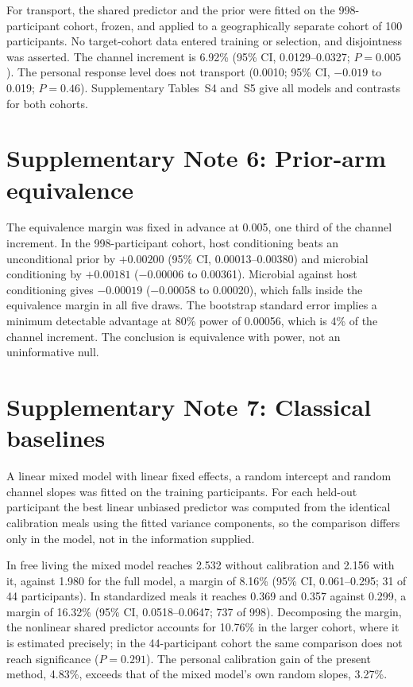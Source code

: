 \documentclass[10pt]{article}
\begin{document}
For transport, the shared predictor and the prior were fitted on the 998-participant cohort,
frozen, and applied to a geographically separate cohort of 100 participants. No target-cohort data
entered training or selection, and disjointness was asserted. The channel increment is 6.92\%
(95\% CI, 0.0129--0.0327; $P=0.005$). The personal response level does not transport
(0.0010; 95\% CI, $-0.019$ to 0.019; $P=0.46$). Supplementary Tables~S4 and~S5 give all models and
contrasts for both cohorts.



\clearpage

\section*{Supplementary Note 6: Prior-arm equivalence}

The equivalence margin was fixed in advance at 0.005, one third of the channel increment. In the
998-participant cohort, host conditioning beats an unconditional prior by $+0.00200$
(95\% CI, 0.00013--0.00380) and microbial conditioning by $+0.00181$ ($-0.00006$ to 0.00361).
Microbial against host conditioning gives $-0.00019$ ($-0.00058$ to 0.00020), which falls inside
the equivalence margin in all five draws. The bootstrap standard error implies a minimum
detectable advantage at 80\% power of 0.00056, which is 4\% of the channel increment. The
conclusion is equivalence with power, not an uninformative null.


\clearpage

\section*{Supplementary Note 7: Classical baselines}

A linear mixed model with linear fixed effects, a random intercept and random channel slopes was
fitted on the training participants. For each held-out participant the best linear unbiased
predictor was computed from the identical calibration meals using the fitted variance components,
so the comparison differs only in the model, not in the information supplied.

In free living the mixed model reaches 2.532 without calibration and 2.156 with it, against 1.980
for the full model, a margin of 8.16\% (95\% CI, 0.061--0.295; 31 of 44 participants). In
standardized meals it reaches 0.369 and 0.357 against 0.299, a margin of 16.32\%
(95\% CI, 0.0518--0.0647; 737 of 998). Decomposing the margin, the nonlinear shared predictor
accounts for 10.76\% in the larger cohort, where it is estimated precisely; in the 44-participant
cohort the same comparison does not reach significance ($P=0.291$). The personal calibration gain
of the present method, 4.83\%, exceeds that of the mixed model's own random slopes, 3.27\%.
\end{document}

